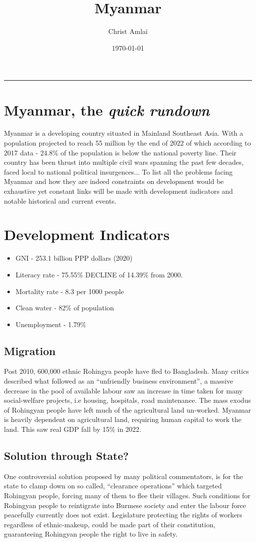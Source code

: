 \documentclass{article}
\title{Myanmar}
\author{Christ Amlai}
\date{\today}
\begin{document}
\maketitle
\par\rule{\textwidth}{1pt}
\section*{Myanmar, the \textit{quick rundown}}
Myanmar is a developing country situated in Mainland Southeast Asia.
With a population projected to reach 55 million by the end of 2022
of which according to 2017 data - 24.8\% of the population is
below the national poverty line. Their country has been thrust into
multiple civil wars spanning the past few decades, faced local to national
political insurgences... To list all the problems facing Myanmar and how they
are indeed constraints on development would be exhaustive yet constant links will be made with development indicators and notable historical and current events.

\section*{Development Indicators}
\begin{itemize}
    \item GNI - 253.1 billion PPP dollars (2020)
    \item Literacy rate - 75.55\% DECLINE of 14.39\% from 2000.
    \item Mortality rate - 8.3 per 1000 people
    \item Clean water - 82\% of population
    \item Unemployment - 1.79\%
\end{itemize}
\subsection*{Migration}
Post 2010, 600,000 ethnic Rohingya people have fled to Bangladesh.
Many critics described what followed as an ``unfriendly business environment'',
a massive decrease in the pool of available labour saw an increase in time taken for many social-welfare projects, i.e housing, hospitals, road maintenance.
The mass exodus of Rohingyan people have left much of the agricultural land un-worked. Myanmar is heavily dependent on agricultural land, requiring human capital to work the land. This saw real GDP fall by 15\% in 2022.
\subsection*{Solution through State?}
One controversial solution proposed by many political commentators, is for the state to clamp down on so called, ``clearance operations'' which targeted Rohingyan people, forcing many of them to flee their villages. Such conditions for Rohingyan people to reintigrate into Burmese society and enter the labour force peacefully currently does not exist. Legislature protecting the rights of workers regardless of ethnic-makeup, could be made part of their constitution, guaranteeing Rohingyan people the right to live in safety.
\end{document}
